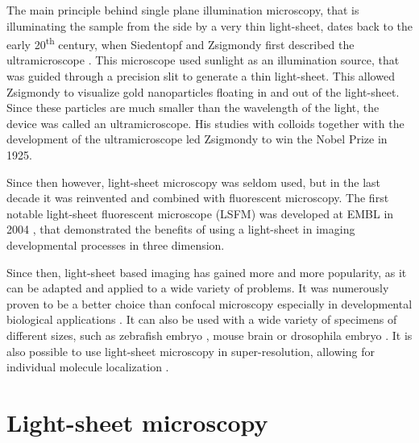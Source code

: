 \documentclass{diploma_style}
\begin{document}
The main principle behind single plane illumination microscopy, that is illuminating the sample from the side by a very thin light-sheet, dates back to the early 20\textsuperscript{th} century, when Siedentopf and Zsigmondy first described the ultramicroscope \cite{siedentopf_uber_1902}. This microscope used sunlight as an illumination source, that was guided through a precision slit to generate a thin light-sheet. This allowed Zsigmondy to visualize gold nanoparticles floating in and out of the light-sheet. Since these particles are much smaller than the wavelength of the light, the device was called an ultramicroscope. His studies with colloids together with the development of the ultramicroscope led Zsigmondy to win the Nobel Prize in 1925.

Since then however, light-sheet microscopy was seldom used, but in the last decade it was reinvented and combined with fluorescent microscopy. The first notable light-sheet fluorescent microscope (LSFM) was developed at EMBL in 2004 \cite{huisken_optical_2004}, that demonstrated the benefits of using a light-sheet in imaging developmental processes in three dimension.

Since then, light-sheet based imaging has gained more and more popularity, as it can be adapted and applied to a wide variety of problems. It was numerously proven to be a better choice than confocal microscopy \cite{reynaud_light_2008,huisken_selective_2009} especially in developmental biological applications \cite{weber_light_2011}. It can also be used with a wide variety of specimens of different sizes, such as zebrafish embryo \cite{keller_reconstruction_2008}, mouse brain \cite{dodt_ultramicroscopy:_2007} or drosophila embryo \cite{krzic_multiview_2012}. It is also possible to use light-sheet microscopy in super-resolution, allowing for individual molecule localization \cite{cella_zanacchi_live-cell_2011}.
	

\section{Light-sheet microscopy}
\end{document}
